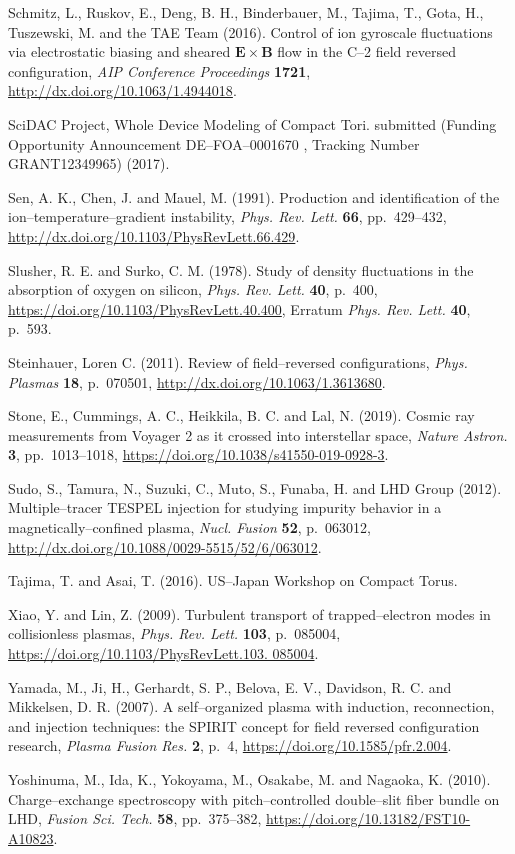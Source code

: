 \documentclass[a4paper,openany,12pt]{book}
\begin{document}
\begin{thebibliography}{100}
\bibitem{}
Schmitz, L., Ruskov, E., Deng, B. H., Binderbauer, M., Tajima, T., Gota, H., Tuszewski, M. and the TAE Team (2016). Control of ion gyroscale fluctuations via electrostatic biasing and sheared $\bm{E\times B}$ flow in the C--2 field reversed configuration, \emph{AIP Conference Proceedings} \textbf{1721}, \url{http://dx.doi.org/10.1063/1.4944018}.

\bibitem{}
 SciDAC Project, Whole Device Modeling of Compact Tori. submitted (Funding Opportunity Announcement DE--FOA--0001670 , Tracking Number GRANT12349965) (2017).

\bibitem{}
Sen, A. K., Chen, J. and Mauel, M. (1991). Production and identification of the ion--temperature--gradient instability, \emph{Phys. Rev. Lett.} \textbf{66}, pp.~429--432, \url{http://dx.doi.org/10.1103/PhysRevLett.66.429}.

\bibitem{}
Slusher, R. E. and Surko, C. M. (1978). Study of density fluctuations in the absorption of oxygen on silicon, \emph{Phys. Rev. Lett.} \textbf{40}, p.~400, \url{https://doi.org/10.1103/PhysRevLett.40.400},
Erratum \emph{Phys. Rev. Lett.} \textbf{40}, p.~593.

\bibitem{}
Steinhauer, Loren C. (2011). Review of field--reversed configurations, \emph{Phys. Plasmas} \textbf{18}, p.~070501, \url{http://dx.doi.org/10.1063/1.3613680}.

\bibitem{}
Stone, E., Cummings, A. C., Heikkila, B. C. and Lal, N. (2019). Cosmic ray measurements from Voyager 2 as it crossed into interstellar space, \emph{Nature Astron.} \textbf{3}, pp.~1013--1018, \url{https://doi.org/10.1038/s41550-019-0928-3}.

\bibitem{}
Sudo, S., Tamura, N., Suzuki, C., Muto, S., Funaba, H. and LHD Group (2012). Multiple--tracer TESPEL injection for studying impurity behavior in a magnetically--confined plasma, \emph{Nucl. Fusion} \textbf{52}, p.~063012, \url{http://dx.doi.org/10.1088/0029-5515/52/6/063012}.

\bibitem{}
Tajima, T. and Asai, T. (2016). US--Japan Workshop on Compact Torus.

\bibitem{}
Xiao, Y. and Lin, Z. (2009). Turbulent transport of trapped--electron modes in collisionless plasmas, \emph{Phys. Rev. Lett.} \textbf{103}, p.~085004, \url{https://doi.org/10.1103/PhysRevLett.103. 085004}.

\bibitem{}
Yamada, M., Ji, H., Gerhardt, S. P., Belova, E. V., Davidson, R. C. and Mikkelsen, D. R. (2007). A self--organized plasma with induction, reconnection, and injection techniques: the SPIRIT concept for field reversed configuration research, \emph{Plasma Fusion Res.} \textbf{2}, p.~4, \url{https://doi.org/10.1585/pfr.2.004}.

\bibitem{}
Yoshinuma, M., Ida, K., Yokoyama, M., Osakabe, M. and Nagaoka, K. (2010). Charge--exchange spectroscopy with pitch--controlled double--slit fiber bundle on LHD, \emph{Fusion Sci. Tech.} \textbf{58}, pp.~375--382, \url{https://doi.org/10.13182/FST10-A10823}.

\end{thebibliography}
\end{document}
